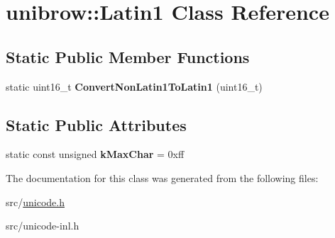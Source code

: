 \hypertarget{classunibrow_1_1_latin1}{}\section{unibrow\+:\+:Latin1 Class Reference}
\label{classunibrow_1_1_latin1}
\subsection*{Static Public Member Functions}
\begin{DoxyCompactItemize}
\item 
\hypertarget{classunibrow_1_1_latin1_af5bb91c291f7f54168bd749499b24ed3}{}static uint16\+\_\+t {\bfseries Convert\+Non\+Latin1\+To\+Latin1} (uint16\+\_\+t)\label{classunibrow_1_1_latin1_af5bb91c291f7f54168bd749499b24ed3}

\end{DoxyCompactItemize}
\subsection*{Static Public Attributes}
\begin{DoxyCompactItemize}
\item 
\hypertarget{classunibrow_1_1_latin1_aa184fb4edf2b3decc925d3968febe65e}{}static const unsigned {\bfseries k\+Max\+Char} = 0xff\label{classunibrow_1_1_latin1_aa184fb4edf2b3decc925d3968febe65e}

\end{DoxyCompactItemize}


The documentation for this class was generated from the following files\+:\begin{DoxyCompactItemize}
\item 
src/\hyperlink{unicode_8h}{unicode.\+h}\item 
src/unicode-\/inl.\+h\end{DoxyCompactItemize}

